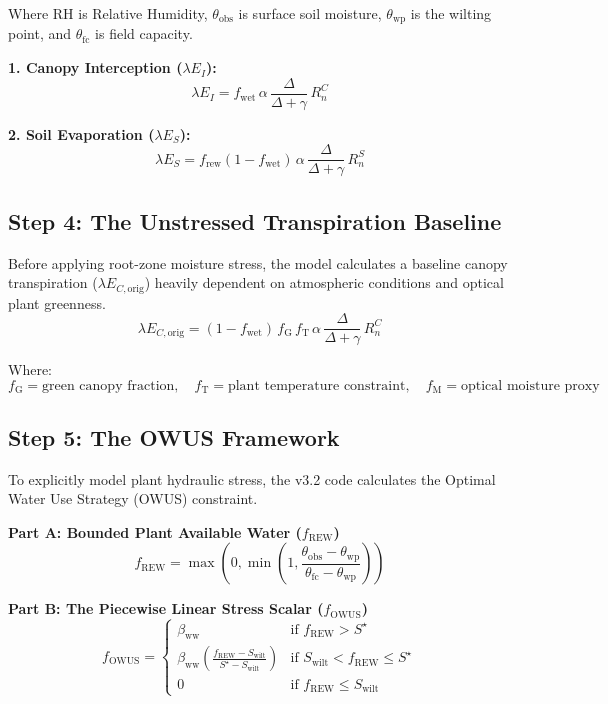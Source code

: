 \documentclass[11pt]{article}
\begin{document}
Where $\mathrm{RH}$ is Relative Humidity, $\theta_{\mathrm{obs}}$ is surface soil moisture, $\theta_{\mathrm{wp}}$ is the wilting point, and $\theta_{\mathrm{fc}}$ is field capacity.

\textbf{1. Canopy Interception ($\lambda E_I$):}
\[
  \lambda E_I = f_{\mathrm{wet}}\,\alpha\,\frac{\Delta}{\Delta + \gamma}\,R_n^C
\]

\textbf{2. Soil Evaporation ($\lambda E_S$):}
\[
  \lambda E_S = f_{\mathrm{rew}}(1 - f_{\mathrm{wet}})\,\alpha\,\frac{\Delta}{\Delta + \gamma}\,R_n^S
\]

\subsection*{Step 4: The Unstressed Transpiration Baseline}

Before applying root-zone moisture stress, the model calculates a baseline canopy transpiration ($\lambda E_{C,\mathrm{orig}}$) heavily dependent on atmospheric conditions and optical plant greenness.
\[
  \lambda E_{C,\mathrm{orig}} = (1 - f_{\mathrm{wet}})\,f_{\mathrm{G}}\,f_{\mathrm{T}}\,\alpha\,\frac{\Delta}{\Delta + \gamma}\,R_n^C
\]

Where:
\[
  f_{\mathrm{G}} = \text{green canopy fraction},\quad f_{\mathrm{T}} = \text{plant temperature constraint},\quad f_{\mathrm{M}} = \text{optical moisture proxy}
\]

\subsection*{Step 5: The OWUS Framework}

To explicitly model plant hydraulic stress, the v3.2 code calculates the Optimal Water Use Strategy (OWUS) constraint.

\textbf{Part A: Bounded Plant Available Water ($f_{\mathrm{REW}}$)}
\[
  f_{\mathrm{REW}} = \max\left(0, \min\left(1, \frac{\theta_{\mathrm{obs}} - \theta_{\mathrm{wp}}}{\theta_{\mathrm{fc}} - \theta_{\mathrm{wp}}}\right)\right)
\]

\textbf{Part B: The Piecewise Linear Stress Scalar ($f_{\mathrm{OWUS}}$)}
\[
  f_{\mathrm{OWUS}} = \begin{cases}
    \beta_{\mathrm{ww}} & \text{if } f_{\mathrm{REW}} > S^\star \\
    \beta_{\mathrm{ww}}\left(\frac{f_{\mathrm{REW}} - S_{\mathrm{wilt}}}{S^\star - S_{\mathrm{wilt}}}\right) & \text{if } S_{\mathrm{wilt}} < f_{\mathrm{REW}} \le S^\star \\
    0 & \text{if } f_{\mathrm{REW}} \le S_{\mathrm{wilt}}
  \end{cases}
\]
\end{document}
